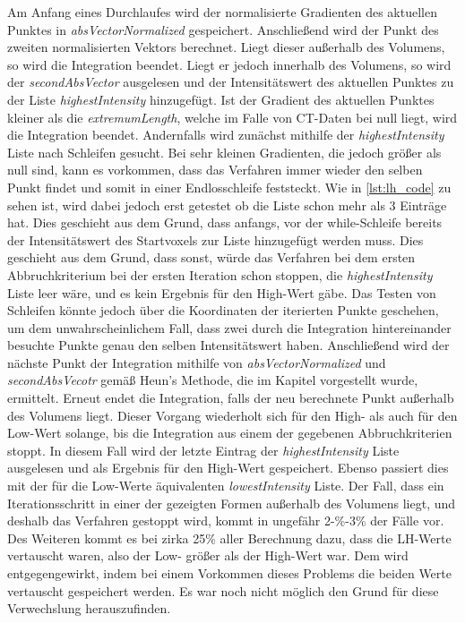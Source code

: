 Am Anfang eines Durchlaufes wird der normalisierte Gradienten des aktuellen Punktes in \textit{absVectorNormalized} gespeichert. Anschließend wird der Punkt des zweiten normalisierten Vektors berechnet. Liegt dieser außerhalb des Volumens, so wird die Integration beendet. Liegt er jedoch innerhalb des Volumens, so wird der \textit{secondAbsVector} ausgelesen und der Intensitätswert des aktuellen Punktes zu der Liste \textit{highestIntensity} hinzugefügt. Ist der Gradient des aktuellen Punktes kleiner als die \textit{extremumLength}, welche im Falle von CT-Daten bei null liegt, wird die Integration beendet.
\newline
Andernfalls wird zunächst mithilfe der \textit{highestIntensity} Liste nach Schleifen gesucht. Bei sehr kleinen Gradienten, die jedoch größer als null sind, kann es vorkommen, dass das Verfahren immer wieder den selben Punkt findet und somit in einer Endlosschleife feststeckt.
Wie in \autoref{lst:lh_code} zu sehen ist, wird dabei jedoch erst getestet ob die Liste schon mehr als 3 Einträge hat. Dies geschieht aus dem Grund, dass anfangs, vor der while-Schleife bereits der Intensitätswert des Startvoxels zur Liste hinzugefügt werden muss. Dies geschieht aus dem Grund, dass sonst, würde das Verfahren bei dem ersten Abbruchkriterium bei der ersten Iteration schon stoppen, die \textit{highestIntensity} Liste leer wäre, und es kein Ergebnis für den High-Wert gäbe.
Das Testen von Schleifen könnte jedoch über die Koordinaten der iterierten Punkte geschehen, um dem unwahrscheinlichem Fall, dass zwei durch die Integration hintereinander besuchte Punkte genau den selben Intensitätswert haben.
Anschließend wird der nächste Punkt der Integration mithilfe von \textit{absVectorNormalized} und \textit{secondAbsVecotr} gemäß Heun's Methode, die im Kapitel  vorgestellt wurde, ermittelt. Erneut endet die Integration, falls der neu berechnete Punkt außerhalb des Volumens liegt.
\newline
Dieser Vorgang wiederholt sich für den High- als auch für den Low-Wert solange, bis die Integration aus einem der gegebenen Abbruchkriterien stoppt. In diesem Fall wird der letzte Eintrag der \textit{highestIntensity} Liste ausgelesen und als Ergebnis für den High-Wert gespeichert. Ebenso passiert dies mit der für die Low-Werte äquivalenten \textit{lowestIntensity} Liste.
Der Fall, dass ein Iterationsschritt in einer der gezeigten Formen außerhalb des Volumens liegt, und deshalb das Verfahren gestoppt wird, kommt in ungefähr 2-\%-3\% der Fälle vor. Des Weiteren kommt es bei zirka 25\% aller Berechnung dazu, dass die LH-Werte vertauscht waren, also der Low- größer als der High-Wert war. Dem wird entgegengewirkt, indem bei einem Vorkommen dieses Problems die beiden Werte vertauscht gespeichert werden. Es war noch nicht möglich den Grund für diese Verwechslung herauszufinden.



